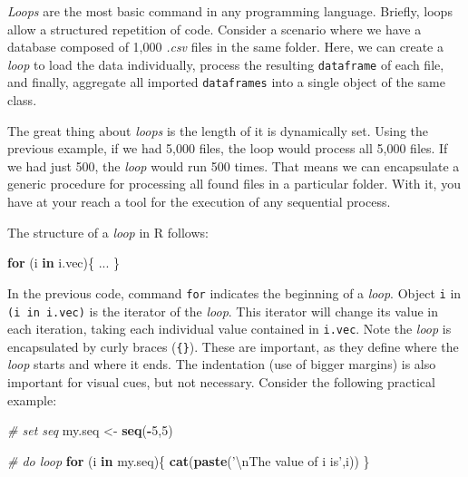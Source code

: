 \documentclass[11pt,]{book}
\newenvironment{Shaded}{\begin{snugshade}}{\end{snugshade}}
\newcommand{\KeywordTok}[1]{\textcolor[rgb]{0.27,0.27,0.27}{\textbf{#1}}}
\newcommand{\DecValTok}[1]{\textcolor[rgb]{0.06,0.06,0.06}{#1}}
\newcommand{\CharTok}[1]{\textcolor[rgb]{0.5,0.5,0.5}{#1}}
\newcommand{\StringTok}[1]{\textcolor[rgb]{0.5,0.5,0.5}{#1}}
\newcommand{\CommentTok}[1]{\textcolor[rgb]{0.56,0.35,0.01}{\textit{#1}}}
\newcommand{\ControlFlowTok}[1]{\textcolor[rgb]{0.13,0.29,0.53}{\textbf{#1}}}
\newcommand{\OperatorTok}[1]{\textcolor[rgb]{0.81,0.36,0.00}{\textbf{#1}}}
\newcommand{\NormalTok}[1]{#1}
\begin{document}
\emph{Loops} are the most basic command in any programming language.
Briefly, loops allow a structured repetition of code. Consider a
scenario where we have a database composed of 1,000 \emph{.csv} files in
the same folder. Here, we can create a \emph{loop} to load the data
individually, process the resulting \texttt{dataframe} of each file, and
finally, aggregate all imported \texttt{dataframes} into a single object
of the same class. 

The great thing about \emph{loops} is the length of it is dynamically
set. Using the previous example, if we had 5,000 files, the loop would
process all 5,000 files. If we had just 500, the \emph{loop} would run
500 times. That means we can encapsulate a generic procedure for
processing all found files in a particular folder. With it, you have at
your reach a tool for the execution of any sequential process.

The structure of a \emph{loop} in R follows:

\begin{Shaded}
\begin{Highlighting}[]
\ControlFlowTok{for}\NormalTok{ (i }\ControlFlowTok{in}\NormalTok{ i.vec)\{}
\NormalTok{  ...}
\NormalTok{\}}
\end{Highlighting}
\end{Shaded}

In the previous code, command \texttt{for} indicates the beginning of a
\emph{loop}. Object \texttt{i} in \texttt{(i\ in\ i.vec)} is the
iterator of the \emph{loop}. This iterator will change its value in each
iteration, taking each individual value contained in \texttt{i.vec}.
Note the \emph{loop} is encapsulated by curly braces (\texttt{\{\}}).
These are important, as they define where the \emph{loop} starts and
where it ends. The indentation (use of bigger margins) is also important
for visual cues, but not necessary. Consider the following practical
example:

\begin{Shaded}
\begin{Highlighting}[]
\CommentTok{# set seq}
\NormalTok{my.seq <-}\StringTok{ }\KeywordTok{seq}\NormalTok{(}\OperatorTok{-}\DecValTok{5}\NormalTok{,}\DecValTok{5}\NormalTok{)}

\CommentTok{# do loop}
\ControlFlowTok{for}\NormalTok{ (i }\ControlFlowTok{in}\NormalTok{ my.seq)\{}
  \KeywordTok{cat}\NormalTok{(}\KeywordTok{paste}\NormalTok{(}\StringTok{'}\CharTok{\textbackslash{}n}\StringTok{The value of i is'}\NormalTok{,i))}
\NormalTok{\}}
\end{Highlighting}
\end{Shaded}
\end{document}

